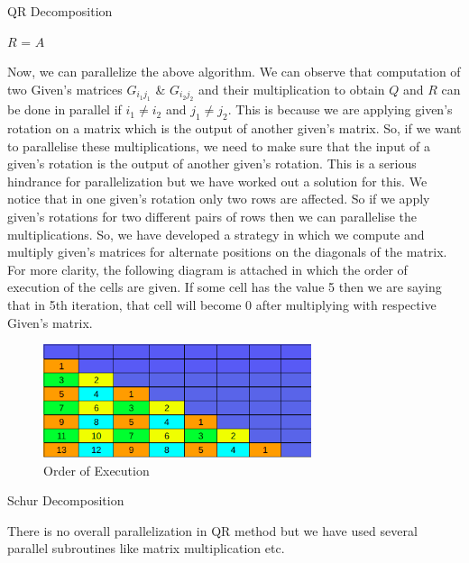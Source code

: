 \documentclass[12pt,a4paper]{article}
\begin{document}
\begin{algorithm}
\caption{QR Decomposition}\label{euclid}
\begin{algorithmic}[1]
\State $R$ = $A$
\State {}
    \EndFor
\EndFor
{}
\end{algorithmic}
\end{algorithm}


Now, we can parallelize the above algorithm. We can observe that computation of two Given's matrices $G_{i_{1}j_{1}}$ & $G_{i_{2}j_{2}}$ and their multiplication to obtain $Q$ and $R$ can be done in parallel if $i_{1} \neq i_{2}$ and $j_{1} \neq j_{2}$. This is because we are applying given's rotation on a matrix which is the output of another given's matrix. So, if we want to parallelise these multiplications, we need to make sure that the input of a given's rotation is the output of another given's rotation. This is a serious hindrance for parallelization but we have worked out a solution for this. We notice that in one given's rotation only two rows are affected. So if we apply given's rotations for two different pairs of rows then we can parallelise the multiplications. So, we have developed a strategy in which we compute and multiply given's matrices for alternate positions on the diagonals of the matrix. For more clarity, the following diagram is attached in which the order of execution of the cells are given. If some cell has the value 5 then we are saying that in 5th iteration, that cell will become 0 after multiplying with respective Given's matrix.

\begin{figure}
    \centering
    \includegraphics[width=0.70\textwidth]{givens.png}
    \caption{Order of Execution}
\end{figure}

\begin{algorithm}
\caption{Schur Decomposition}\label{euclid}
\begin{algorithmic}[1]
\State {}
\EndFor
{}
\end{algorithmic}
\end{algorithm}
There is no overall parallelization in QR method but we have used several parallel subroutines like matrix multiplication etc.
\end{document}

